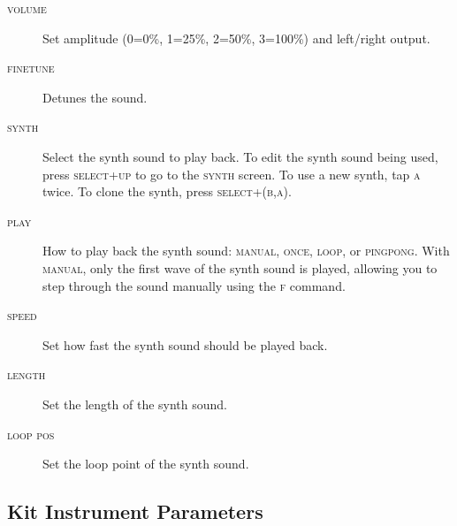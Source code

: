 \begin{description}
    \item[\textsc{volume}] Set amplitude (0=0\%, 1=25\%, 2=50\%, 3=100\%) and left/right output.
    \item[\textsc{finetune}] Detunes the sound.
    \item[\textsc{synth}] Select the synth sound to play back. To edit the synth sound being used, press \textsc{select+up} to go to the \textsc{synth} screen. To use a new synth, tap \textsc{a} twice. To clone the synth, press \textsc{select+(b,a)}.
    \item[\textsc{play}] How to play back the synth sound: \textsc{manual}, \textsc{once}, \textsc{loop}, or \textsc{pingpong}. With \textsc{manual}, only the first wave of the synth sound is played, allowing you to step through the sound manually using the \textsc{f} command.
	\item[\textsc{speed}] Set how fast the synth sound should be played back.
	\item[\textsc{length}] Set the length of the synth sound.
	\item[\textsc{loop pos}] Set the loop point of the synth sound.
\end{description}

\subsection{Kit Instrument Parameters}

\begin{figure}[hbtp]
	\begin{center}
	\end{center}
\end{figure}

